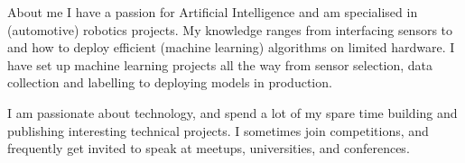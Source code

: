 \documentclass[]{mcdowellcv}
\begin{document}
	\makeheader
\vspace{-0.4cm}
		\begin{cvsection}{}
		\begin{cvsubsection}{About me}{}{}
		I have a passion for Artificial Intelligence and am specialised in (automotive) robotics projects.  My knowledge ranges from interfacing sensors to and how to deploy efficient (machine learning) algorithms on limited hardware.  I have set up machine learning projects all the way from sensor selection, data collection and labelling to deploying models in production. 

		I am passionate about technology,  and spend a lot of my spare time building and publishing interesting technical projects.  I sometimes join competitions, and frequently get invited to speak at meetups, universities, and conferences.
	\end{cvsubsection}
	\end{cvsection}
\end{document}
